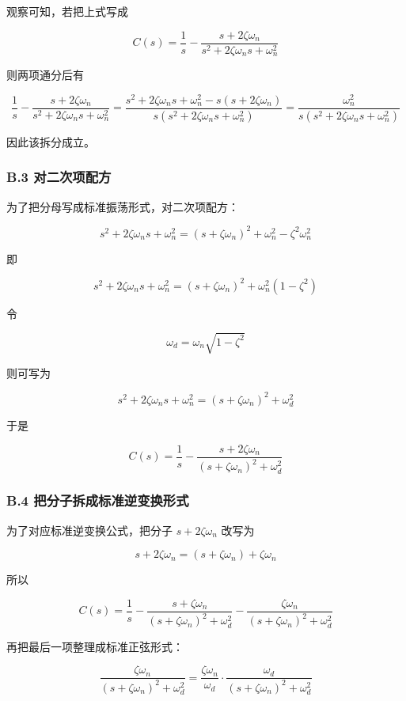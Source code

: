 \documentclass[
  11pt]{article}
\begin{document}
观察可知，若把上式写成

\[
C(s)=\frac{1}{s}-\frac{s+2\zeta\omega_n}{s^2+2\zeta\omega_n s+\omega_n^2}
\]

则两项通分后有

\[
\frac{1}{s}-\frac{s+2\zeta\omega_n}{s^2+2\zeta\omega_n s+\omega_n^2}
=
\frac{s^2+2\zeta\omega_n s+\omega_n^2-s(s+2\zeta\omega_n)}{s\left(s^2+2\zeta\omega_n s+\omega_n^2\right)}
=
\frac{\omega_n^2}{s\left(s^2+2\zeta\omega_n s+\omega_n^2\right)}
\]

因此该拆分成立。

\subsubsection{B.3
对二次项配方}\label{b.3-ux5bf9ux4e8cux6b21ux9879ux914dux65b9}

为了把分母写成标准振荡形式，对二次项配方：

\[
s^2+2\zeta\omega_n s+\omega_n^2
=
(s+\zeta\omega_n)^2+\omega_n^2-\zeta^2\omega_n^2
\]

即

\[
s^2+2\zeta\omega_n s+\omega_n^2
=
(s+\zeta\omega_n)^2+\omega_n^2(1-\zeta^2)
\]

令

\[
\omega_d=\omega_n\sqrt{1-\zeta^2}
\]

则可写为

\[
s^2+2\zeta\omega_n s+\omega_n^2=(s+\zeta\omega_n)^2+\omega_d^2
\]

于是

\[
C(s)=\frac{1}{s}-\frac{s+2\zeta\omega_n}{(s+\zeta\omega_n)^2+\omega_d^2}
\]

\subsubsection{B.4
把分子拆成标准逆变换形式}\label{b.4-ux628aux5206ux5b50ux62c6ux6210ux6807ux51c6ux9006ux53d8ux6362ux5f62ux5f0f}

为了对应标准逆变换公式，把分子 \(s+2\zeta\omega_n\) 改写为

\[
s+2\zeta\omega_n=(s+\zeta\omega_n)+\zeta\omega_n
\]

所以

\[
C(s)=\frac{1}{s}
-\frac{s+\zeta\omega_n}{(s+\zeta\omega_n)^2+\omega_d^2}
-\frac{\zeta\omega_n}{(s+\zeta\omega_n)^2+\omega_d^2}
\]

再把最后一项整理成标准正弦形式：

\[
\frac{\zeta\omega_n}{(s+\zeta\omega_n)^2+\omega_d^2}
=
\frac{\zeta\omega_n}{\omega_d}\cdot
\frac{\omega_d}{(s+\zeta\omega_n)^2+\omega_d^2}
\]
\end{document}
